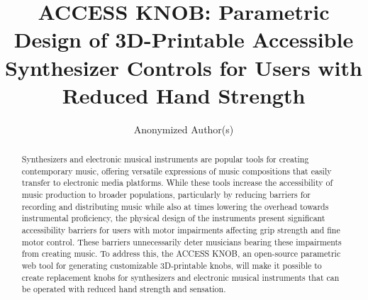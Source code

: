 \documentclass[manuscript,screen,review,anonymous]{acmart}
\begin{document}
\title{ACCESS KNOB: Parametric Design of 3D-Printable Accessible Synthesizer Controls for Users with Reduced Hand Strength}

\author{Anonymized Author(s)}

%



\begin{abstract}
Synthesizers and electronic musical instruments are popular tools for creating contemporary music, offering versatile expressions of music compositions that easily transfer to electronic media platforms. While these tools increase the accessibility of music production to broader populations, particularly by reducing barriers for recording and distributing music while also at times lowering the overhead towards instrumental proficiency, the physical design of the instruments present significant accessibility barriers for users with motor impairments affecting grip strength and fine motor control. These barriers unnecessarily deter musicians bearing these impairments from creating music. To address this, the ACCESS KNOB, an open-source parametric web tool for generating customizable 3D-printable knobs, will  make it possible to create replacement knobs for synthesizers and electronic musical instruments that can be operated with reduced hand strength and sensation. 
\end{abstract}
\end{document}
